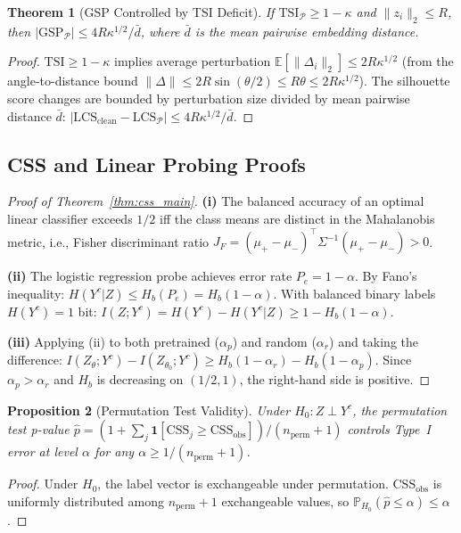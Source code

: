 \documentclass[10pt]{article}
\newtheorem{theorem}{Theorem}[section]
\newtheorem{proposition}[theorem]{Proposition}
\theoremstyle{definition}
\theoremstyle{remark}
\newcommand{\E}{\mathbb{E}}
\newcommand{\Prob}{\mathbb{P}}
\newcommand{\norm}[1]{\lVert #1 \rVert}
\newcommand{\abs}[1]{\lvert #1 \rvert}
\newcommand{\lcs}{\ensuremath{\mathrm{LCS}}}
\newcommand{\tsi}{\ensuremath{\mathrm{TSI}}}
\newcommand{\gsp}{\ensuremath{\mathrm{GSP}}}
\newcommand{\css}{\ensuremath{\mathrm{CSS}}}
\newcommand{\Hb}{\ensuremath{H_b}}
\begin{document}
\begin{theorem}[GSP Controlled by TSI Deficit]
\label{thm:gsp_bound_app}
If $\tsi_{\mathcal{P}} \geq 1-\kappa$ and $\norm{z_i}_2 \leq R$, then
$\abs{\gsp_{\mathcal{P}}} \leq 4R\kappa^{1/2}/\bar{d}$,
where $\bar{d}$ is the mean pairwise embedding distance.
\end{theorem}
\begin{proof}
$\tsi \geq 1-\kappa$ implies average perturbation $\E[\norm{\Delta_i}_2]
\leq 2R\kappa^{1/2}$ (from the angle-to-distance bound
$\norm{\Delta} \leq 2R\sin(\theta/2) \leq R\theta \leq 2R\kappa^{1/2}$).
The silhouette score changes are bounded by perturbation size divided by
mean pairwise distance $\bar{d}$:
$\abs{\lcs_{\mathrm{clean}}-\lcs_{\mathcal{P}}} \leq 4R\kappa^{1/2}/\bar{d}$.
\end{proof}

\subsection{CSS and Linear Probing Proofs}
\label{app:probing_proofs}

\begin{proof}[Proof of Theorem~\ref{thm:css_main}]
\textbf{(i)} The balanced accuracy of an optimal linear classifier exceeds
$1/2$ iff the class means are distinct in the Mahalanobis metric, i.e.,
Fisher discriminant ratio $J_F = (\mu_+-\mu_-)^\top\Sigma^{-1}(\mu_+-\mu_-)
> 0$.

\textbf{(ii)} The logistic regression probe achieves error rate $P_e = 1-\alpha$.
By Fano's inequality: $H(Y^c | Z) \leq \Hb(P_e) = \Hb(1-\alpha)$.
With balanced binary labels $H(Y^c) = 1$ bit:
$I(Z;Y^c) = H(Y^c) - H(Y^c|Z) \geq 1 - \Hb(1-\alpha)$.

\textbf{(iii)} Applying (ii) to both pretrained ($\alpha_p$) and random
($\alpha_r$) and taking the difference:
$I(Z_\theta;Y^c) - I(Z_{\theta_0};Y^c) \geq \Hb(1-\alpha_r) - \Hb(1-\alpha_p)$.
Since $\alpha_p > \alpha_r$ and $\Hb$ is decreasing on $(1/2, 1)$, the
right-hand side is positive.
\end{proof}

\begin{proposition}[Permutation Test Validity]
\label{prop:permtest_app}
Under $H_0: Z \perp Y^c$, the permutation test p-value
$\hat{p} = (1 + \sum_j\mathbf{1}[\css_j \geq \css_{\mathrm{obs}}])/(n_{\mathrm{perm}}+1)$
controls Type~I error at level $\alpha$ for any
$\alpha \geq 1/(n_{\mathrm{perm}}+1)$.
\end{proposition}
\begin{proof}
Under $H_0$, the label vector is exchangeable under permutation.
$\css_{\mathrm{obs}}$ is uniformly distributed among $n_{\mathrm{perm}}+1$
exchangeable values, so $\Prob_{H_0}(\hat{p} \leq \alpha) \leq \alpha$.
\end{proof}
\end{document}
